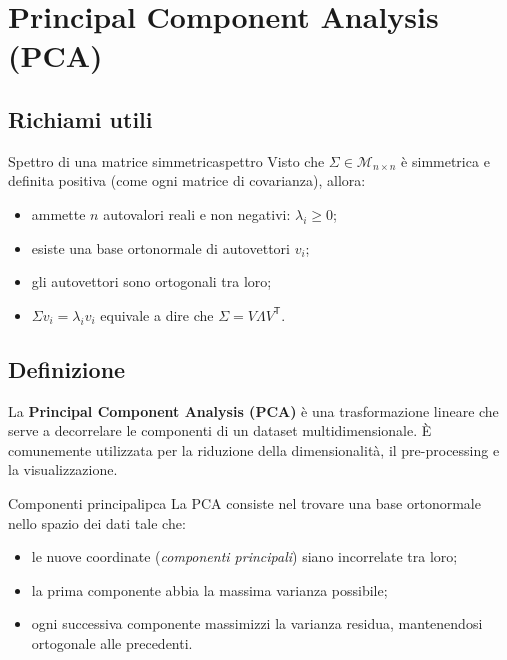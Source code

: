 \section{Principal Component Analysis (PCA)}\label{sec:pca}

\subsection{Richiami utili}

\begin{nota}{Spettro di una matrice simmetrica}{spettro}
Visto che \( \Sigma \in \mathcal{M}_{n \times n}\) è simmetrica e definita positiva (come ogni matrice di covarianza), allora:
\begin{itemize}
  \item ammette $n$ autovalori reali e non negativi: \( \lambda_i \geq 0 \);
  \item esiste una base ortonormale di autovettori \( v_i \);
  \item gli autovettori sono ortogonali tra loro;
  \item \( \Sigma v_i = \lambda_i v_i \) equivale a dire che \( \Sigma = V \Lambda V^\mathsf{T} \).
\end{itemize}
\end{nota}

\subsection{Definizione}

La \textbf{Principal Component Analysis (PCA)} è una trasformazione lineare che serve a decorrelare le componenti di un dataset multidimensionale. È comunemente utilizzata per la riduzione della dimensionalità, il pre-processing e la visualizzazione.

\begin{definizione}{Componenti principali}{pca}
La PCA consiste nel trovare una base ortonormale nello spazio dei dati tale che:
\begin{itemize}
  \item le nuove coordinate (\emph{componenti principali}) siano incorrelate tra loro;
  \item la prima componente abbia la massima varianza possibile;
  \item ogni successiva componente massimizzi la varianza residua, mantenendosi ortogonale alle precedenti.
\end{itemize}
\end{definizione}

